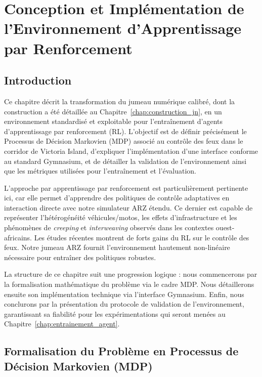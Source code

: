 \chapter{Conception et Implémentation de l'Environnement d'Apprentissage par Renforcement}
\label{chap:conception_env_rl}

\section{Introduction}
\label{sec:intro_conception_rl}

Ce chapitre décrit la transformation du jumeau numérique calibré, dont la construction a été détaillée au Chapitre~\ref{chap:construction_jn}, en un environnement standardisé et exploitable pour l'entraînement d'agents d'apprentissage par renforcement (RL). L'objectif est de définir précisément le Processus de Décision Markovien (MDP) associé au contrôle des feux dans le corridor de Victoria Island, d'expliquer l'implémentation d'une interface conforme au standard Gymnasium, et de détailler la validation de l'environnement ainsi que les métriques utilisées pour l'entraînement et l'évaluation.

L'approche par apprentissage par renforcement est particulièrement pertinente ici, car elle permet d'apprendre des politiques de contrôle adaptatives en interaction directe avec notre simulateur ARZ étendu. Ce dernier est capable de représenter l'hétérogénéité véhicules/motos, les effets d'infrastructure et les phénomènes de \textit{creeping} et \textit{interweaving} observés dans les contextes ouest-africains. Les études récentes \parencite{reinforcement2024approach, cooperative2019traffic} montrent de forts gains du RL sur le contrôle des feux. Notre jumeau ARZ fournit l'environnement hautement non-linéaire nécessaire pour entraîner des politiques robustes.

La structure de ce chapitre suit une progression logique : nous commencerons par la formalisation mathématique du problème via le cadre MDP. Nous détaillerons ensuite son implémentation technique via l'interface Gymnasium. Enfin, nous conclurons par la présentation du protocole de validation de l'environnement, garantissant sa fiabilité pour les expérimentations qui seront menées au Chapitre~\ref{chap:entrainement_agent}.

\section{Formalisation du Problème en Processus de Décision Markovien (MDP)}
\label{sec:formalisation_mdp}

